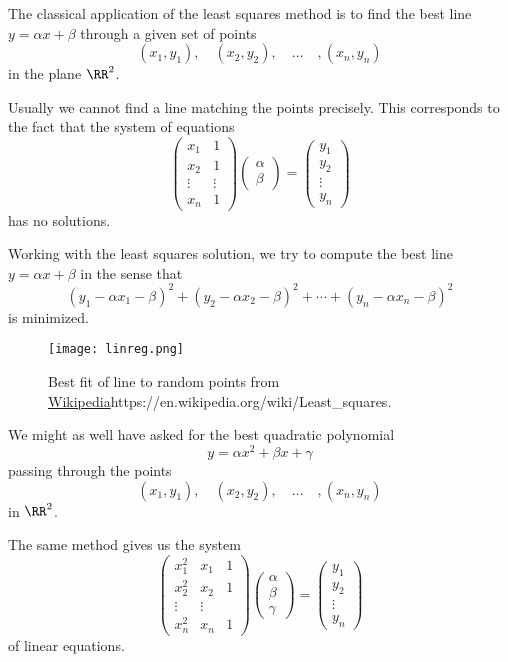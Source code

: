 \documentclass{article}
\begin{document}
\begin{example}
  The classical application of the least squares method is to find
the best line $y = \alpha x + \beta$ through a given set of points
$$
(x_1, y_1), \quad (x_2, y_2), \quad \dots \quad, (x_n, y_n)
$$
in the plane $\RR^2$.

Usually we cannot find a line matching the points precisely. This corresponds to the fact that
the system of equations
$$
\begin{pmatrix}
x_1 & 1\\
x_2 & 1\\
\vdots & \vdots\\
x_n & 1
\end{pmatrix}
\begin{pmatrix}
\alpha \\ \beta
\end{pmatrix}
= 
\begin{pmatrix}
y_1 \\
y_2 \\
\vdots \\
y_n
\end{pmatrix}
$$
has no solutions.

Working with the least squares solution, we try to compute the best
line $y = \alpha x + \beta$ in the sense that
$$
(y_1 -\alpha x_1 -\beta)^2 + (y_2 -\alpha x_2 -\beta)^2 + \cdots +
(y_n -\alpha x_n -\beta)^2 
$$
is minimized.

\begin{figure}
\texttt{[image: linreg.png]}
\caption{Best fit of line to random points from \url{Wikipedia}{https://en.wikipedia.org/wiki/Least_squares}.}
\end{figure}

We might as well have asked for the best quadratic polynomial 
$$
y = \alpha x^2 + \beta x + \gamma 
$$
passing through the points
$$
(x_1, y_1), \quad (x_2, y_2), \quad \dots \quad, (x_n, y_n)
$$
in $\RR^2$.

The same method gives us the system
$$
\begin{pmatrix}
x_1^2 & x_1 & 1\\
x_2 ^2 & x_2 & 1\\
\vdots & \vdots\\
x_n^2 & x_n & 1
\end{pmatrix}
\begin{pmatrix}
\alpha \\ \beta \\ \gamma
\end{pmatrix}
= 
\begin{pmatrix}
y_1 \\
y_2 \\
\vdots \\
y_n
\end{pmatrix}
$$
of linear equations.



\end{example}
\end{document}
